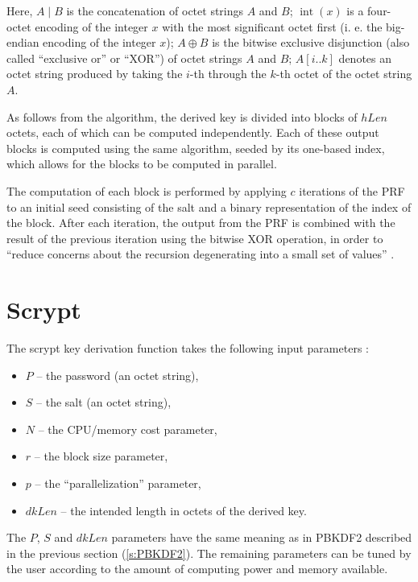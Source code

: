 \documentclass[12pt,oneside]{fithesis2}
\begin{document}
      Here, $A \mid B$ is the concatenation of octet strings $A$ and $B$; $\operatorname{int}(x)$ is a four-octet encoding of the integer $x$ with the most significant octet first (i. e. the big-endian encoding of the integer $x$); $A \oplus B$ is the bitwise exclusive disjunction (also called ``exclusive or'' or ``XOR'') of octet strings $A$ and $B$; $A[i..k]$ denotes an octet string produced by taking the $i$-th through the $k$-th octet of the octet string $A$.
      
      As follows from the algorithm, the derived key is divided into blocks of $hLen$ octets, each of which can be computed independently. Each of these output blocks is computed using the same algorithm, seeded by its one-based index, which allows for the blocks to be computed in parallel.
      
      The computation of each block is performed by applying $c$ iterations of the PRF to an initial seed consisting of the salt and a binary representation of the index of the block. After each iteration, the output from the PRF is combined with the result of the previous iteration using the bitwise XOR operation, in order to ``reduce concerns about the recursion degenerating into a small set of values'' \cite[section 5.2]{rfc2898}.
      
      \section{Scrypt} \label{s:scrypt}
      The scrypt key derivation function takes the following input parameters \cite[chapter 7]{scrypt}:
      \begin{itemize}
        \item $P$ -- the password (an octet string),
        \item $S$ -- the salt (an octet string),
        \item $N$ -- the CPU/memory cost parameter,
        \item $r$ -- the block size parameter,
        \item $p$ -- the ``parallelization'' parameter,
        \item $dkLen$ -- the intended length in octets of the derived key.
      \end{itemize}
      
      The $P$, $S$ and $dkLen$ parameters have the same meaning as in PBKDF2 described in the previous section (\ref{s:PBKDF2}). The remaining parameters can be tuned by the user according to the amount of computing power and memory available.
\end{document}
